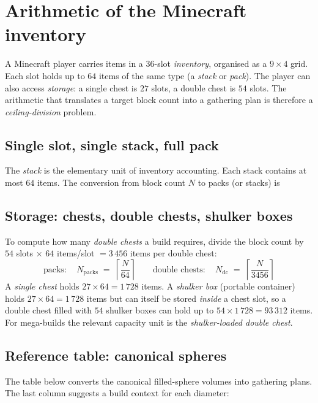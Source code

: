 \documentclass[12pt,a4paper]{scrartcl}
\begin{document}
\clearpage

\section{Arithmetic of the Minecraft inventory}

A Minecraft player carries items in a 36-slot \emph{inventory}, organised as a $9 \times 4$ grid. Each slot holds up to $64$ items of the same type (a \emph{stack} or \emph{pack}). The player can also access \emph{storage}: a single chest is $27$ slots, a double chest is $54$ slots. The arithmetic that translates a target block count into a gathering plan is therefore a \emph{ceiling-division} problem.

\subsection{Single slot, single stack, full pack}
The \emph{stack} is the elementary unit of inventory accounting. Each stack contains at most $64$ items. The conversion from block count $N$ to packs (or stacks) is

\subsection{Storage: chests, double chests, shulker boxes}
To compute how many \emph{double chests} a build requires, divide the block count by $54$ slots $\times$ $64$ items/slot $= 3\,456$ items per double chest:
\[
\text{packs}:\quad N_{\mathrm{packs}} \;=\; \left\lceil \dfrac{N}{64} \right\rceil
\qquad
\text{double chests}:\quad N_{\mathrm{dc}} \;=\; \left\lceil \dfrac{N}{3456} \right\rceil
\]
A \emph{single chest} holds $27 \times 64 = 1\,728$ items. A \emph{shulker box} (portable container) holds $27 \times 64 = 1\,728$ items but can itself be stored \emph{inside} a chest slot, so a double chest filled with $54$ shulker boxes can hold up to $54 \times 1\,728 = 93\,312$ items. For mega-builds the relevant capacity unit is the \emph{shulker-loaded double chest}.

\subsection{Reference table: canonical spheres}
The table below converts the canonical filled-sphere volumes into gathering plans. The last column suggests a build context for each diameter:
\nopagebreak
\end{document}
